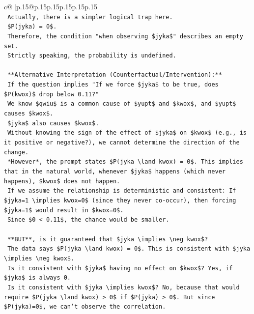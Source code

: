 \documentclass{article}
\begin{document}
{\begin{supertabular}{c@{$\;$}|p{.15\linewidth}@{}p{.15\linewidth}p{.15\linewidth}p{.15\linewidth}p{.15\linewidth}p{.15\linewidth}}
{{{\\ 
\texttt{        Actually, there is a simpler logical trap here.} \\
\texttt{        \$P(jyka) = 0\$.} \\
\texttt{        Therefore, the condition "when observing \$jyka\$" describes an empty set.} \\
\texttt{        Strictly speaking, the probability is undefined.} \\
\\ 
\texttt{        **Alternative Interpretation (Counterfactual/Intervention):**} \\
\texttt{        If the question implies "If we force \$jyka\$ to be true, does \$P(kwox)\$ drop below 0.11?"} \\
\texttt{        We know \$qwiu\$ is a common cause of \$yupt\$ and \$kwox\$, and \$yupt\$ causes \$kwox\$.} \\
\texttt{        \$jyka\$ also causes \$kwox\$.} \\
\texttt{        Without knowing the sign of the effect of \$jyka\$ on \$kwox\$ (e.g., is it positive or negative?), we cannot determine the direction of the change.} \\
\texttt{        *However*, the prompt states \$P(jyka \textbackslash{}land kwox) = 0\$. This implies that in the natural world, whenever \$jyka\$ happens (which never happens), \$kwox\$ does not happen.} \\
\texttt{        If we assume the relationship is deterministic and consistent: If \$jyka=1 \textbackslash{}implies kwox=0\$ (since they never co{-}occur), then forcing \$jyka=1\$ would result in \$kwox=0\$.} \\
\texttt{        Since \$0 < 0.11\$, the chance would be smaller.} \\
\\ 
\texttt{        **BUT**, is it guaranteed that \$jyka \textbackslash{}implies \textbackslash{}neg kwox\$?} \\
\texttt{        The data says \$P(jyka \textbackslash{}land kwox) = 0\$. This is consistent with \$jyka \textbackslash{}implies \textbackslash{}neg kwox\$.} \\
\texttt{        Is it consistent with \$jyka\$ having no effect on \$kwox\$? Yes, if \$jyka\$ is always 0.} \\
\texttt{        Is it consistent with \$jyka \textbackslash{}implies kwox\$? No, because that would require \$P(jyka \textbackslash{}land kwox) > 0\$ if \$P(jyka) > 0\$. But since \$P(jyka)=0\$, we can't observe the correlation.} \\
}}}
\end{supertabular}}
\end{document}
